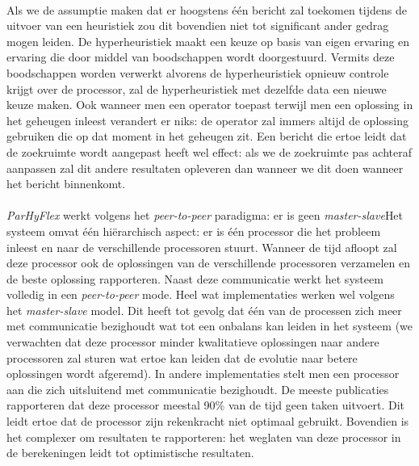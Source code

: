 \paragraph{}%
Als we de assumptie maken dat er hoogstens \'e\'en bericht zal toekomen tijdens de uitvoer van een heuristiek zou dit bovendien niet tot significant ander gedrag mogen leiden. De hyperheuristiek maakt een keuze op basis van eigen ervaring en ervaring die door middel van boodschappen wordt doorgestuurd. Vermits deze boodschappen worden verwerkt alvorens de hyperheuristiek opnieuw controle krijgt over de processor, zal de hyperheuristiek met dezelfde data een nieuwe keuze maken. Ook wanneer men een operator toepast terwijl men een oplossing in het geheugen inleest verandert er niks: de operator zal immers altijd de oplossing gebruiken die op dat moment in het geheugen zit. Een bericht die ertoe leidt dat de zoekruimte wordt aangepast heeft wel effect: als we de zoekruimte pas achteraf aanpassen zal dit andere resultaten opleveren dan wanneer we dit doen wanneer het bericht binnenkomt.

\paragraph{}
\emph{ParHyFlex} werkt volgens het \emph{peer-to-peer} paradigma: er is geen \emph{master-slave}Het systeem omvat \'e\'en hi\"erarchisch aspect: er is \'e\'en processor die het probleem inleest en naar de verschillende processoren stuurt. Wanneer de tijd afloopt zal deze processor ook de oplossingen van de verschillende processoren verzamelen en de beste oplossing rapporteren. Naast deze communicatie werkt het systeem volledig in een \emph{peer-to-peer} mode. Heel wat implementaties werken wel volgens het \emph{master-slave} model\cite{}. Dit heeft tot gevolg dat \'e\'en van de processen zich meer met communicatie bezighoudt wat tot een onbalans kan leiden in het systeem (we verwachten dat deze processor minder kwalitatieve oplossingen naar andere processoren zal sturen wat ertoe kan leiden dat de evolutie naar betere oplossingen wordt afgeremd). In andere implementaties\cite{} stelt men een processor aan die zich uitsluitend met communicatie bezighoudt. De meeste publicaties rapporteren dat deze processor meestal 90\% van de tijd geen taken uitvoert. Dit leidt ertoe dat de processor zijn rekenkracht niet optimaal gebruikt. Bovendien is het complexer om resultaten te rapporteren: het weglaten van deze processor in de berekeningen leidt tot optimistische resultaten.